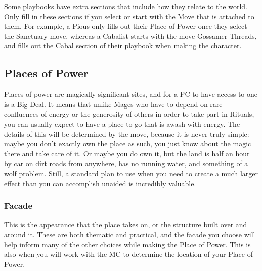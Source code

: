 \documentclass[
  oneside,
  statementpaper,
  9pt]{memoir}
\begin{document}
\begin{Player}

Some playbooks have extra sections that include how they relate to the world. Only fill in these sections if you select or start with the Move that is attached to them. For example, a Pious only fills out their Place of Power once they select the Sanctuary move, whereas a Cabalist starts with the move Gossamer Threads, and fills out the Cabal section of their playbook when making the character.

\end{Player}

\hypertarget{places-of-power}{%
\subsection{Places of Power}\label{places-of-power}}

\begin{Player}

Places of power are magically significant sites, and for a PC to have access to one is a Big Deal. It means that unlike Mages who have to depend on rare confluences of energy or the generosity of others in order to take part in Rituals, you can usually expect to have a place to go that is awash with energy. The details of this will be determined by the move, because it is never truly simple: maybe you don't exactly own the place as such, you just know about the magic there and take care of it. Or maybe you do own it, but the land is half an hour by car on dirt roads from anywhere, has no running water, and something of a wolf problem. Still, a standard plan to use when you need to create a much larger effect than you can accomplish unaided is incredibly valuable.

\end{Player}

\hypertarget{facade}{%
\subsubsection{Facade}\label{facade}}

\begin{Player}

This is the appearance that the place takes on, or the structure built over and around it. These are both thematic and practical, and the facade you choose will help inform many of the other choices while making the Place of Power. This is also when you will work with the MC to determine the location of your Place of Power.

\end{Player}
\end{document}
